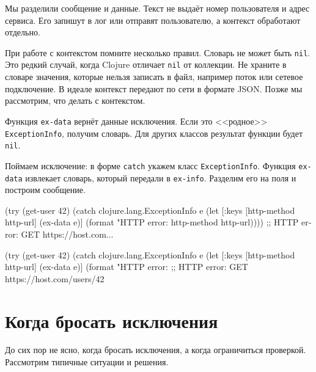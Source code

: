 Мы разделили сообщение и данные. Текст не выдаёт номер пользователя и адрес
сервиса. Его запишут в лог или отправят пользователю, а контекст обработают
отдельно.

При работе с контекстом помните несколько правил. Словарь не может быть
\verb|nil|. Это редкий случай, когда Clojure отличает \verb|nil| от
коллекции. Не храните в словаре значения, которые нельзя записать в файл,
например поток или сетевое подключение. В идеале контекст передают по сети в
формате JSON. Позже мы рассмотрим, что делать с контекстом.

Функция \verb|ex-data| вернёт данные исключения. Если это <<родное>>
\verb|ExceptionInfo|, получим словарь. Для других классов результат функции
будет \verb|nil|.


Поймаем исключение: в форме \verb|catch| укажем класс
\verb|ExceptionInfo|. Функция \verb|ex-data| извлекает словарь, который передали
в \verb|ex-info|. Разделим его на поля и построим сообщение.

\ifx\devicetype\mobile

\begin{english}
  \begin{clojure}
(try
  (get-user 42)
  (catch clojure.lang.ExceptionInfo e
    (let [{:keys [http-method http-url]}
          (ex-data e)]
      (format "HTTP error: %
        http-method http-url))))
;; HTTP error: GET https://host.com...
  \end{clojure}
\end{english}

\else

\begin{english}
  \begin{clojure}
(try
  (get-user 42)
  (catch clojure.lang.ExceptionInfo e
    (let [{:keys [http-method http-url]} (ex-data e)]
      (format "HTTP error: %
;; HTTP error: GET https://host.com/users/42
  \end{clojure}
\end{english}

\fi

\section{Когда бросать исключения}

До сих пор не ясно, когда бросать исключения, а когда ограничиться
проверкой. Рассмотрим типичные ситуации и решения.

